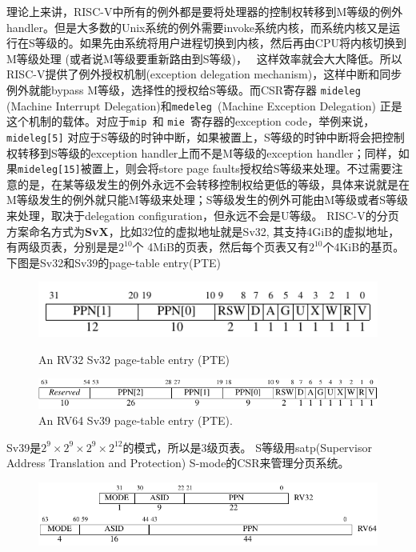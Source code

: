 \documentclass{article}
\newenvironment{commentary}
{ \vspace{-0.1in}
  \begin{quotation}
  \noindent
  \small \em
  \rule{\linewidth}{1pt}\\
}
{
  \end{quotation}
}
\begin{document}
\begin{enumerate}
	理论上来讲，RISC-V中所有的例外都是要将处理器的控制权转移到M等级的例外handler。但是大多数的Unix系统的例外需要invoke系统内核，而系统内核又是运行在S等级的。如果先由系统将用户进程切换到内核，然后再由CPU将内核切换到M等级处理 (或者说M等级要重新路由到S等级)，~\cite{reader}
	这样效率就会大大降低。所以RISC-V提供了例外授权机制(exception delegation mechanism)，这样中断和同步例外就能bypass M等级，选择性的授权给S等级。而CSR寄存器 {\tt mideleg }(Machine Interrupt Delegation)和{\tt medeleg }(Machine Exception  Delegation) 正是这个机制的载体。对应于{\tt mip }和 {\tt mie }寄存器的exception code，举例来说，{\tt mideleg[5]} 对应于S等级的时钟中断，如果被置上，S等级的时钟中断将会把控制权转移到S等级的exception handler上而不是M等级的exception handler；同样，如果{\tt mideleg[15]}被置上，则会将store page faults授权给S等级来处理。不过需要注意的是，在某等级发生的例外永远不会转移控制权给更低的等级，具体来说就是在M等级发生的例外就只能M等级来处理；S等级发生的例外可能由M等级或者S等级来处理，取决于delegation configuration，但永远不会是U等级。
	RISC-V的分页方案命名方式为\textbf{SvX}，比如32位的虚拟地址就是Sv32, 其支持4GiB的虚拟地址，有两级页表，分别是是$ 2^{10} $个 4MiB的页表，然后每个页表又有$ 2^{10} $个4KiB的基页。下图是Sv32和Sv39的page-table entry(PTE)~\cite{reader}
	\begin{figure}[H]
		\centering
		\includegraphics[width=0.5\linewidth]{figs/Sv32.png}
		\captionsetup{labelformat=empty}
		\caption{An RV32 Sv32 page-table entry (PTE)}
		\includegraphics[width=\linewidth]{figs/Sv39.png}
		\captionsetup{labelformat=empty}
		\caption{An RV64 Sv39 page-table entry (PTE). }
	\end{figure}
	Sv39是$ 2^9\times 2^9\times 2^9 \times 2^{12} $的模式，所以是3级页表。
	S等级用satp(Supervisor Address Translation and Protection) S-mode的CSR来管理分页系统。
	\begin{figure}[H]
		\centering
		\includegraphics[width=0.7\linewidth]{figs/satp.png}

\end{figure}
\end{enumerate}
\end{document}
